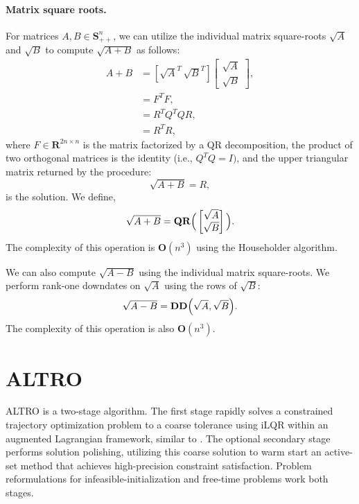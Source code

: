 \paragraph{Matrix square roots.}
For matrices $A, B \in \mathbf{S}_{++}^{n}$, we can utilize the individual matrix square-roots $\sqrt{A}$ and  $\sqrt{B}$ to compute $\sqrt{A + B}$ as follows:
\begin{align}
	A + B &= [\sqrt{A}^T\, \sqrt{B}^T]\begin{bmatrix} \sqrt{A} \\ \sqrt{B} \end{bmatrix},\\
	&= F^T F, \\
	&= R^T Q^T Q R, \\
	&= R^T R, 
\end{align}
where $F \in \mathbf{R}^{2n \times n}$ is the matrix factorized by a QR decomposition, the product of two orthogonal matrices is the identity (i.e., $Q^T Q = I)$, and the upper triangular matrix returned by the procedure:
\begin{equation}
\sqrt{A + B} = R,
\end{equation} 
is the solution. We define,
\begin{equation}
	\sqrt{A + B} = \mbox{\textbf{QR}}\Big(\begin{bmatrix} \sqrt{A} \\ \sqrt{B} \end{bmatrix}\Big).
\end{equation}
The complexity of this operation is $\mathbf{O}(n^3)$ using the Householder algorithm.

We can also compute $\sqrt{A - B}$ using the individual matrix square-roots. We perform rank-one downdates on $\sqrt{A}$ using the rows of $\sqrt{B}$:
\begin{equation}
	\sqrt{A - B} = \mbox{\textbf{DD}}\Big(\sqrt{A}, \sqrt{B}\Big).
\end{equation}
The complexity of this operation is also $\mathbf{O}(n^3)$.

\section{ALTRO} \label{altro_algorithm}
ALTRO is a two-stage algorithm. The first stage rapidly solves a constrained trajectory optimization problem to a coarse tolerance using iLQR within an augmented Lagrangian framework, similar to \cite{plancher2017constrained}. The optional secondary stage performs solution polishing, utilizing this coarse solution to warm start an active-set method that achieves high-precision constraint satisfaction. Problem reformulations for infeasible-initialization and free-time problems work both stages.

